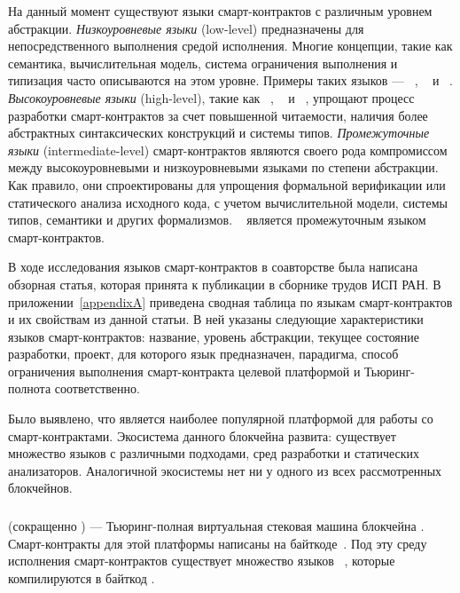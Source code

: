 На данный момент существуют языки смарт-контрактов с различным уровнем абстракции. 
\emph{Низкоуровневые языки} (low-level) предназначены для непосредственного выполнения средой исполнения.
Многие концепции, такие как семантика, вычислительная модель, система ограничения выполнения и типизация часто описываются на этом уровне.
Примеры таких языков --- ~\cite{EthereumYellowPaper}, ~\cite{BitcoinScript} и ~\cite{Michelson}.
\emph{Высокоуровневые языки} (high-level), такие как ~\cite{Solidity}, ~\cite{Flint} и ~\cite{liquidity},
упрощают процесс разработки смарт-контрактов за счет повышенной читаемости, наличия более абстрактных синтаксических конструкций и системы типов.
\emph{Промежуточные языки} (intermediate-level) смарт-контрактов являются своего рода компромиссом между высокоуровневыми и низкоуровневыми языками по степени абстракции.
Как правило, они спроектированы для упрощения формальной верификации или статического анализа исходного кода, с учетом вычислительной модели, системы типов, семантики и других формализмов.
~\cite{Scilla} является промежуточным языком смарт-контрактов.

В ходе исследования языков смарт-контрактов в соавторстве была написана обзорная статья, которая принята к публикации в сборнике трудов ИСП РАН.
В приложении~\ref{appendixA} приведена сводная таблица по языкам смарт-кон\-трак\-тов и их свойствам из данной статьи.
В ней указаны следующие характеристики языков смарт-контрактов: название, уровень абстракции, текущее состояние разработки, проект, для которого язык предназначен, парадигма, способ ограничения выполнения смарт-контракта целевой платформой и Тьюринг-полнота соответственно.

Было выявлено, что  является наиболее популярной платформой для работы со смарт-контрактами.
Экосистема данного блокчейна развита: существует множество языков с различными подходами, сред разработки и статических анализаторов.
Аналогичной экосистемы нет ни у одного из всех рассмотренных блокчейнов.


\subsubsection{}
 (сокращенно ) --- Тьюринг-полная виртуальная стековая машина блокчейна .
Смарт-контракты для этой платформы написаны на байткоде~\cite{EthereumYellowPaper}.
Под эту среду исполнения смарт-контрактов существует множество языков ~\cite{Bamboo, Flint, IELE, Logikon, Solidity, SolidityX, Vyper, LLL, Yul}, которые компилируются в байткод .

